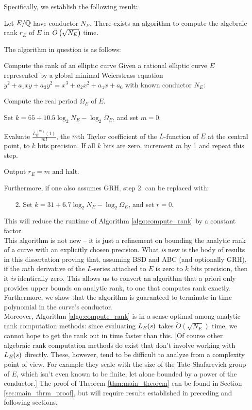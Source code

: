 Specifically, we establish the following result:
\begin{theorem}
\label{thm:main_theorem}
Let $E/\mathbb{Q}$ have conductor $N_E$. There exists an algorithm to compute the algebraic rank $r_E$ of $E$ in $\tilde{O}\left(\sqrt{N_E}\right)$ time.
\end{theorem}
The algorithm in question is as follows:
\begin{algorithm}{Compute the rank of an elliptic curve}\label{algo:compute_rank}
Given a rational elliptic curve $E$ represented by a global minimal Weierstrass equation $y^2 + a_1 xy + a_3 y^2 = x^3 + a_2 x^2 + a_4 x + a_6$ with known conductor $N_E$:
\begin{steps}
\item Compute the real period $\Omega_E$ of $E$.
\item Set $k = 65 + 10.5 \log_2 N_E - \log_2 \Omega_E$, and set $m=0$.
\item Evaluate $\frac{L_E^{(m)}(1)}{m!}$, the $m$th Taylor coefficient of the $L$-function of $E$ at the central point, to $k$ bits precision. If all $k$ bits are zero, increment $m$ by 1 and repeat this step.
\item Output $r_E=m$ and halt.
\end{steps}
\end{algorithm}

Furthermore, if one also assumes GRH, step 2. can be replaced with:
\begin{enumerate}
\item[2.] Set $k = 31 + 6.7 \log_2 N_E - \log_2 \Omega_E$, and set $r=0$.
\end{enumerate}
This will reduce the runtime of Algorithm \ref{algo:compute_rank} by a constant factor. \\

This algorithm is not new -- it is just a refinement on bounding the analytic rank of a curve with an explicitly chosen precision. What {\it is} new is the body of results in this dissertation proving that, assuming BSD and ABC (and optionally GRH), if the $m$th derivative of the $L$-series attached to $E$ is zero to $k$ bits precision, then it {\it is} identically zero. This allows us to convert an algorithm that a priori only provides upper bounds on analytic rank, to one that computes rank exactly. Furthermore, we show that the algorithm is guaranteed to terminate in time polynomial in the curve's conductor. \\

Moreover, Algorithm \ref{algo:compute_rank} is in a sense optimal among analytic rank computation methods: since evaluating $L_E(s)$ takes $\tilde{O}(\sqrt{N_E})$ time, we cannot hope to get the rank out in time faster than this. [Of course other algebraic rank computation methods do exist that don't involve working with $L_E(s)$ directly. These, however, tend to be difficult to analyze from a complexity point of view. For example they scale with the size of the Tate-Shafarevich group of $E$, which isn't even known to be finite, let alone bounded by a power of the conductor.] The proof of Theorem \ref{thm:main_theorem} can be found in Section \ref{sec:main_thrm_proof}, but will require results established in preceding and following sections. \\

